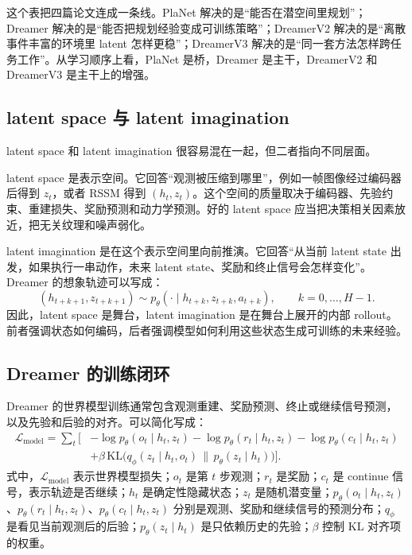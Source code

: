 \documentclass[11pt,a4paper]{ctexart}
\begin{document}
这个表把四篇论文连成一条线。PlaNet 解决的是“能否在潜空间里规划”；Dreamer 解决的是“能否把规划经验变成可训练策略”；DreamerV2 解决的是“离散事件丰富的环境里 latent 怎样更稳”；DreamerV3 解决的是“同一套方法怎样跨任务工作”。从学习顺序上看，PlaNet 是桥，Dreamer 是主干，DreamerV2 和 DreamerV3 是主干上的增强。

\subsection{latent space 与 latent imagination}

latent space 和 latent imagination 很容易混在一起，但二者指向不同层面。

latent space 是表示空间。它回答“观测被压缩到哪里”，例如一帧图像经过编码器后得到 $z_t$，或者 RSSM 得到 $(h_t,z_t)$。这个空间的质量取决于编码器、先验约束、重建损失、奖励预测和动力学预测。好的 latent space 应当把决策相关因素放近，把无关纹理和噪声弱化。

latent imagination 是在这个表示空间里向前推演。它回答“从当前 latent state 出发，如果执行一串动作，未来 latent state、奖励和终止信号会怎样变化”。Dreamer 的想象轨迹可以写成：
\begin{equation}
  (h_{t+k+1},z_{t+k+1})
  \sim
  p_\theta(\cdot\mid h_{t+k},z_{t+k},a_{t+k}),
  \qquad k=0,\ldots,H-1 .
\end{equation}
因此，latent space 是舞台，latent imagination 是在舞台上展开的内部 rollout。前者强调状态如何编码，后者强调模型如何利用这些状态生成可训练的未来经验。

\subsection{Dreamer 的训练闭环}

Dreamer 的世界模型训练通常包含观测重建、奖励预测、终止或继续信号预测，以及先验和后验的对齐。可以简化写成：
\begin{equation}
\begin{aligned}
  \mathcal L_{\mathrm{model}}
  =
  \sum_t \big[
  &-\log p_\theta(o_t\mid h_t,z_t)
  -\log p_\theta(r_t\mid h_t,z_t)
  -\log p_\theta(c_t\mid h_t,z_t)\\
  &+\beta\,\mathrm{KL}\!\bigl(q_\phi(z_t\mid h_t,o_t)\,\|\,p_\theta(z_t\mid h_t)\bigr)
  \big].
\end{aligned}
\end{equation}
式中，$\mathcal L_{\mathrm{model}}$ 表示世界模型损失；$o_t$ 是第 $t$ 步观测；$r_t$ 是奖励；$c_t$ 是 continue 信号，表示轨迹是否继续；$h_t$ 是确定性隐藏状态；$z_t$ 是随机潜变量；$p_\theta(o_t\mid h_t,z_t)$、$p_\theta(r_t\mid h_t,z_t)$、$p_\theta(c_t\mid h_t,z_t)$ 分别是观测、奖励和继续信号的预测分布；$q_\phi$ 是看见当前观测后的后验；$p_\theta(z_t\mid h_t)$ 是只依赖历史的先验；$\beta$ 控制 KL 对齐项的权重。
\end{document}
